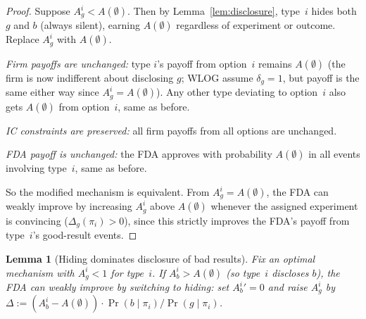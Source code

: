 \documentclass[12pt,a4paper]{article}
\newtheorem{lemma}{Lemma}
\begin{document}
\begin{proof}
Suppose $A_g^i < A(\emptyset)$. Then by
Lemma~\ref{lem:disclosure}, type~$i$ hides both $g$ and $b$
(always silent), earning $A(\emptyset)$ regardless of
experiment or outcome. Replace $A_g^i$ with $A(\emptyset)$.

\emph{Firm payoffs are unchanged:} type $i$'s payoff from
option~$i$ remains $A(\emptyset)$ (the firm is now indifferent
about disclosing $g$; WLOG assume $\delta_g = 1$, but payoff
is the same either way since $A_g^i = A(\emptyset)$). Any
other type deviating to option~$i$ also gets $A(\emptyset)$
from option~$i$, same as before.

\emph{IC constraints are preserved:} all firm payoffs from
all options are unchanged.

\emph{FDA payoff is unchanged:} the FDA approves with
probability $A(\emptyset)$ in all events involving type~$i$,
same as before.

So the modified mechanism is equivalent. From
$A_g^i = A(\emptyset)$, the FDA can weakly improve by
increasing $A_g^i$ above $A(\emptyset)$ whenever the assigned
experiment is convincing ($\Delta_g(\pi_i) > 0$), since this
strictly improves the FDA's payoff from type~$i$'s
good-result events.
\end{proof}

\begin{lemma}[Hiding dominates disclosure of bad results]
\label{lem:hiding_dominates}
Fix an optimal mechanism with $A_g^i < 1$ for type~$i$.
If $A_b^i > A(\emptyset)$ (so type~$i$ discloses $b$),
the FDA can weakly improve by switching to hiding:
set $A_b^i' = 0$ and raise $A_g^i$ by
$\Delta := (A_b^i - A(\emptyset)) \cdot
\Pr(b \mid \pi_i) / \Pr(g \mid \pi_i)$.
\end{lemma}
\end{document}
